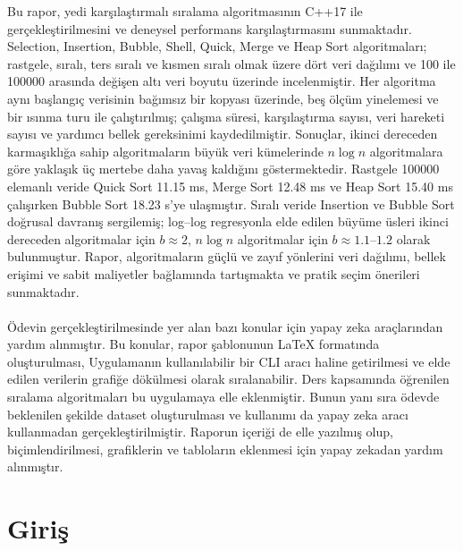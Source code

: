 \documentclass[12pt,a4paper]{article}
\begin{document}
Bu rapor, yedi karşılaştırmalı sıralama algoritmasının C++17 ile
gerçekleştirilmesini ve deneysel performans karşılaştırmasını sunmaktadır.
Selection, Insertion, Bubble, Shell, Quick, Merge ve Heap Sort algoritmaları;
rastgele, sıralı, ters sıralı ve kısmen sıralı olmak üzere dört veri dağılımı ve
100 ile 100000 arasında değişen altı veri boyutu üzerinde incelenmiştir. Her
algoritma aynı başlangıç verisinin bağımsız bir kopyası üzerinde, beş ölçüm
yinelemesi ve bir ısınma turu ile çalıştırılmış; çalışma süresi, karşılaştırma
sayısı, veri hareketi sayısı ve yardımcı bellek gereksinimi kaydedilmiştir.
Sonuçlar, ikinci dereceden karmaşıklığa sahip algoritmaların büyük veri
kümelerinde $n \log n$ algoritmalara göre yaklaşık üç mertebe daha yavaş
kaldığını göstermektedir. Rastgele 100000 elemanlı veride Quick Sort 11.15 ms,
Merge Sort 12.48 ms ve Heap Sort 15.40 ms çalışırken Bubble Sort 18.23 s'ye
ulaşmıştır. Sıralı veride Insertion ve Bubble Sort doğrusal davranış sergilemiş;
log--log regresyonla elde edilen büyüme üsleri ikinci dereceden algoritmalar için
$b \approx 2$, $n \log n$ algoritmalar için $b \approx 1.1$--$1.2$ olarak
bulunmuştur. Rapor, algoritmaların güçlü ve zayıf yönlerini veri dağılımı,
bellek erişimi ve sabit maliyetler bağlamında tartışmakta ve pratik seçim
önerileri sunmaktadır.

\paragraph{}Ödevin gerçekleştirilmesinde yer alan bazı konular için yapay zeka araçlarından yardım alınmıştır.
Bu konular, rapor şablonunun \LaTeX{} formatında oluşturulması, Uygulamanın kullanılabilir bir CLI aracı
haline getirilmesi ve elde edilen verilerin grafiğe dökülmesi olarak sıralanabilir.
Ders kapsamında öğrenilen sıralama algoritmaları bu uygulamaya elle eklenmiştir.
Bunun yanı sıra ödevde beklenilen şekilde dataset oluşturulması ve kullanımı da yapay zeka aracı kullanmadan gerçekleştirilmiştir.
Raporun içeriği de elle yazılmış olup, biçimlendirilmesi, grafiklerin ve tabloların eklenmesi için yapay zekadan yardım alınmıştır.

\newpage
\tableofcontents
\newpage
\listoffigures
\newpage
\listoftables
\newpage


\section{Giriş}
\end{document}
